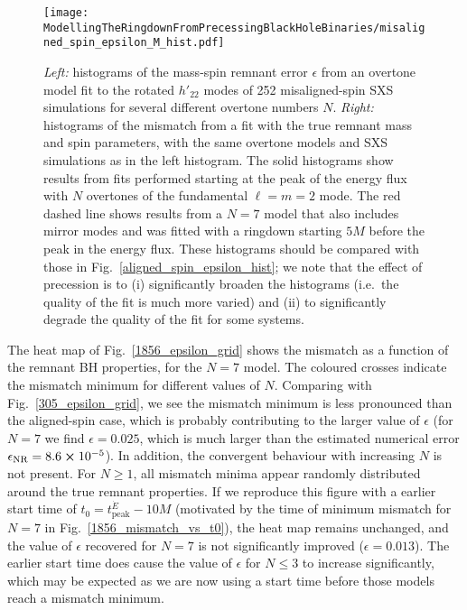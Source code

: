 \begin{figure}[t]
    \centering
    \texttt{[image: ModellingTheRingdownFromPrecessingBlackHoleBinaries/misaligned\_spin\_epsilon\_M\_hist.pdf]}
    \caption[Remnant error and mismatches for fits to misaligned-spin SXS simulations using an overtone model]{
    \emph{Left:} histograms of the mass-spin remnant error $\epsilon$ from an overtone model fit to the rotated $h'_{22}$ modes of 252 misaligned-spin SXS simulations for several different overtone numbers $N$. 
    \emph{Right:} histograms of the mismatch from a fit with the true remnant mass and spin parameters, with the same overtone models and SXS simulations as in the left histogram.
    The solid histograms show results from fits performed starting at the peak of the energy flux with $N$ overtones of the fundamental $\ell = m = 2$ mode.
    The red dashed line shows results from a $N=7$ model that also includes mirror modes and was fitted with a ringdown starting $5M$ before the peak in the energy flux.
    These histograms should be compared with those in Fig.~\ref{aligned_spin_epsilon_hist}; we note that the effect of precession is to (i) significantly broaden the histograms (i.e.\ the quality of the fit is much more varied) and (ii) to significantly degrade the quality of the fit for some systems.
    }
    \label{misaligned_spin_epsilon_hist}
\end{figure}

The heat map of Fig.~\ref{1856_epsilon_grid} shows the mismatch as a function of the remnant BH properties, for the $N=7$ model.
The coloured crosses indicate the mismatch minimum for different values of $N$. 
Comparing with Fig.~\ref{305_epsilon_grid}, we see the mismatch minimum is less pronounced than the aligned-spin case, which is probably contributing to the larger value of $\epsilon$ (for $N=7$ we find $\epsilon = 0.025$, which is much larger than the estimated numerical error $\epsilon_{\mathrm{NR}} = 8.6 \cross 10^{-5}$). 
In addition, the convergent behaviour with increasing $N$ is not present. For $N \geq 1$, all mismatch minima appear randomly distributed around the true remnant properties.
If we reproduce this figure with a earlier start time of $t_0 = t_{\mathrm{peak}}^{\dot{E}} - 10M$ (motivated by the time of minimum mismatch for $N=7$ in Fig.~\ref{1856_mismatch_vs_t0}), the heat map remains unchanged, and the value of $\epsilon$ recovered for $N=7$ is not significantly improved ($\epsilon = 0.013$). The earlier start time does cause the value of $\epsilon$ for $N \leq 3$ to increase significantly, which may be expected as we are now using a start time before those models reach a mismatch minimum. 

